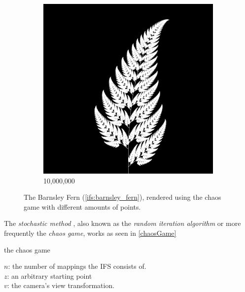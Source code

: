 \documentclass[11pt]{article}
\begin{document}
\begin{figure}
\begin{subfigure}[b]{0.4\textwidth}
         \includegraphics[width=\textwidth]{figures/barnsley_100000000}
         \caption{10,000,000}
         \label{figure:barnsley_ten_mil}
     \end{subfigure}
        \caption{The Barnsley Fern (\autoref{ifs:barnsley_fern}), rendered using the chaos game with different amounts of points.}
        \label{figure:barnsley_chaos_game_points}
\end{figure}


The \emph{stochastic method} \cite{hepting1991rendering}, also known as the \emph{random iteration algorithm} \cite{barnsley1988fractals} or more frequently the \emph{chaos game}, works as seen in \autoref{chaosGame}

\begin{algorithm}
\caption{the chaos game}
\label{chaosGame}
  $n$: the number of mappings the IFS consists of. \\
  $z$: an arbitrary starting point \\
  $v$: the camera's view transformation. \\

\end{algorithm}
\end{document}
